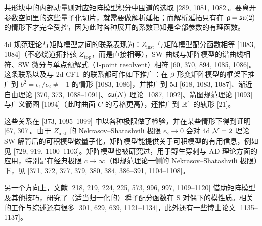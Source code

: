 
共形块中的内部动量则对应矩阵模型积分中围道的选取 [289, 1081, 1082]。要离开参数空间里的这些量子化切片，就需要做解析延拓；而解析延拓只有在 $\mathfrak{g}=\mathfrak{su}(2)$ 的情形下才完全受控，因为此时各种展开的系数已知是全部参数的有理函数。


4d 规范理论与矩阵模型之间的联系表现为：$Z_{\mathrm{inst}}$ 与矩阵模型配分函数相等 [1083, 1084]（不必绕道拓扑弦 $Z_{\mathrm{top}}$，而是直接相等），SW 曲线与矩阵模型的谱曲线相符、SW 微分与单点预解式（1-point resolvent）相符 [60, 370, 894, 1085, 1086]。这条联系以及与 2d CFT 的联系都可作如下推广：在 $\beta$ 形变矩阵模型的框架下推广到 $b^2=\epsilon_1/\epsilon_2\ne-1$ 的情形 [1083, 1086]，并推广到 5d [618, 1083, 1087]、渐近自由理论 [370, 373, 1088--1091]、$\mathfrak{su}(N)$ 理论 [1087, 1092]、箭图规范理论 [1093] 与广义箭图 [1094]（此时曲面 $C$ 的亏格更高），还推广到 $\mathbb{R}^4$ 的轨形 [21]。

这些关系在 [373, 1095--1099] 中以各种极限做了检验，并在某些情形下得到证明 [67, 307]。由于 $Z_{\mathrm{inst}}$ 的 Nekrasov--Shatashvili 极限 $\epsilon_2\to0$ 会对 4d $\mathcal{N}=2$ 理论 SW 解背后的可积模型做量子化，矩阵模型能提供关于可积模型的有用信息，例如见 [729, 919, 1100--1103]。矩阵模型也被研究过，用于野生穿刺与 AD 理论方面的应用，特别是在经典极限 $c\to\infty$（即规范理论一侧的 Nekrasov--Shatashvili 极限）下，见 [371, 372, 377, 379, 380, 384, 386--391, 1104--1108]。

另一个方向上，文献 [218, 219, 224, 225, 573, 996, 997, 1109--1120] 借助矩阵模型及其他技巧，研究了（适当归一化的）瞬子配分函数在 S 对偶下的模性质。相关的工作与综述还有很多 [301, 629, 639, 1121--1134]，此外还有一些博士论文 [1135--1137]。

